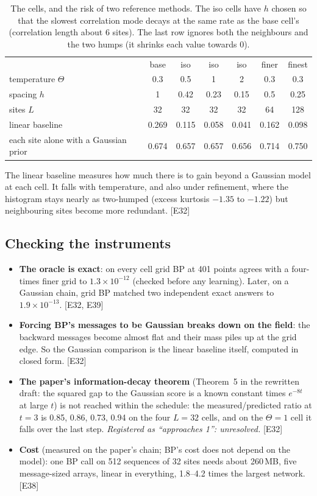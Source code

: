 \documentclass[11pt,a4paper]{article}
\newcommand{\src}[1]{{\footnotesize\color{gray}[#1]}}
\newcommand{\fals}[1]{{\small\itshape #1}}
\begin{document}
\begin{table}[!htbp]\centering\small
\caption{The cells, and the risk of two reference methods. The iso cells have $h$ chosen so that the slowest correlation mode
decays at the same rate as the base cell's (correlation length about 6 sites). The last row ignores both the neighbours and the
two humps (it shrinks each value towards 0).}
\label{tab:cells}
\begin{tabular}{@{}lcccccc@{}}
\toprule
 & base & iso & iso & iso & finer & finest \\
temperature $\Theta$ & 0.3 & 0.5 & 1 & 2 & 0.3 & 0.3 \\
spacing $h$ & 1 & 0.42 & 0.23 & 0.15 & 0.5 & 0.25 \\
sites $L$ & 32 & 32 & 32 & 32 & 64 & 128 \\
\midrule
linear baseline & 0.269 & 0.115 & 0.058 & 0.041 & 0.162 & 0.098 \\
each site alone with a Gaussian prior & 0.674 & 0.657 & 0.657 & 0.656 & 0.714 & 0.750 \\
\bottomrule
\end{tabular}
\end{table}

The linear baseline measures how much there is to gain beyond a Gaussian model at each cell. It falls with temperature, and also
under refinement, where the histogram stays nearly as two-humped (excess kurtosis $-1.35$ to $-1.22$) but neighbouring sites
become more redundant. \src{E32}

\subsection{Checking the instruments}

\begin{itemize}
\item \textbf{The oracle is exact}: on every cell grid BP at 401 points agrees with a four-times finer grid to $1.3\times10^{-12}$
(checked before any learning). Later, on a Gaussian chain, grid BP matched two independent exact answers to $1.9\times10^{-13}$.
\src{E32, E39}
\item \textbf{Forcing BP's messages to be Gaussian breaks down on the field}: the backward messages become almost flat and their mass
piles up at the grid edge. So the Gaussian comparison is the linear baseline itself, computed in closed form. \src{E32}
\item \textbf{The paper's information-decay theorem} (Theorem~5 in the rewritten draft: the squared gap to the Gaussian score is a known
constant times $e^{-8t}$ at large $t$) is not reached within the schedule: the measured/predicted ratio at $t=3$ is 0.85, 0.86, 0.73,
0.94 on the four $L=32$ cells, and on the $\Theta=1$ cell it falls over the last step. \fals{Registered as ``approaches 1'': unresolved.}
\src{E32}
\item \textbf{Cost} (measured on the paper's chain; BP's cost does not depend on the model): one BP call on 512 sequences of 32 sites
needs about 260\,MB, five message-sized arrays, linear in everything, 1.8--4.2 times the largest network. \src{E38}
\end{itemize}
\end{document}
